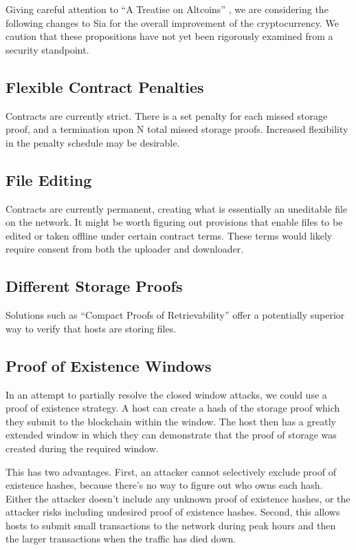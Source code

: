 \documentclass[twocolumn]{article}
\begin{document}
Giving careful attention to ``A Treatise on Altcoins'' \cite{alts}, we are considering the following changes to Sia for the overall improvement of the cryptocurrency.
We caution that these propositions have not yet been rigorously examined from a security standpoint.

\subsection{Flexible Contract Penalties}
Contracts are currently strict.
There is a set penalty for each missed storage proof, and a termination upon N total missed storage proofs.
Increased flexibility in the penalty schedule may be desirable.

\subsection{File Editing}
Contracts are currently permanent, creating what is essentially an uneditable file on the network.
It might be worth figuring out provisions that enable files to be edited or taken offline under certain contract terms.
These terms would likely require consent from both the uploader and downloader.

\subsection{Different Storage Proofs}
Solutions such as ``Compact Proofs of Retrievability'' \cite{cpr} offer a potentially superior way to verify that hosts are storing files.

\subsection{Proof of Existence Windows}
In an attempt to partially resolve the closed window attacks, we could use a proof of existence strategy.
A host can create a hash of the storage proof which they submit to the blockchain within the window.
The host then has a greatly extended window in which they can demonstrate that the proof of storage was created during the required window.

This has two advantages.
First, an attacker cannot selectively exclude proof of existence hashes, because there's no way to figure out who owns each hash.
Either the attacker doesn't include any unknown proof of existence hashes, or the attacker risks including undesired proof of existence hashes.
Second, this allows hosts to submit small transactions to the network during peak hours and then the larger transactions when the traffic has died down.
\end{document}
